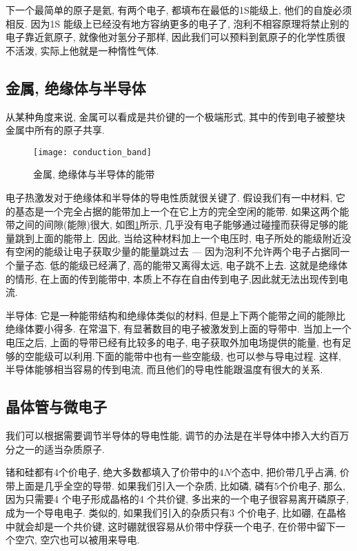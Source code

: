 \documentclass{article}
\begin{document}
下一个最简单的原子是氦, 有两个电子, 都填布在最低的1S能级上, 他们的自旋必须相反.
因为1S 能级上已经没有地方容纳更多的电子了, 泡利不相容原理将禁止别的电子靠近氦原子, 就像他对氢分子那样,
因此我们可以预料到氦原子的化学性质很不活泼, 实际上他就是一种惰性气体.

\subsection{金属, 绝缘体与半导体}
从某种角度来说, 金属可以看成是共价键的一个极端形式, 其中的传到电子被整块金属中所有的原子共享.

\begin{figure}[htbp]
		\centering
		\texttt{[image: conduction\_band]}
		\caption{金属, 绝缘体与半导体的能带}
		\label{fig.paoli.conduction}
\end{figure}
电子热激发对于绝缘体和半导体的导电性质就很关键了.
假设我们有一中材料, 它的基态是一个完全占据的能带加上一个在它上方的完全空闲的能带.
如果这两个能带之间的间隙(能隙)很大, 如图\ref{fig.paoli.conduction}所示, 几乎没有电子能够通过碰撞而获得足够的能量跳到上面的能带上.
因此, 当给这种材料加上一个电压时, 电子所处的能级附近没有空闲的能级让电子获取少量的能量跳过去 --- 因为泡利不允许两个电子占据同一个量子态.
低的能级已经满了, 高的能带又离得太远, 电子跳不上去. 这就是绝缘体的情形, 在上面的传到能带中, 本质上不存在自由传到电子,因此就无法出现传到电流.

半导体: 它是一种能带结构和绝缘体类似的材料, 但是上下两个能带之间的能隙比绝缘体要小得多. 在常温下, 有显著数目的电子被激发到上面的导带中.
当加上一个电压之后, 上面的导带已经有比较多的电子, 电子获取外加电场提供的能量, 也有足够的空能级可以利用.下面的能带中也有一些空能级, 也可以参与导电过程.
这样, 半导体能够相当容易的传到电流, 而且他们的导电性能跟温度有很大的关系.

\subsection{晶体管与微电子}
我们可以根据需要调节半导体的导电性能, 调节的办法是在半导体中掺入大约百万分之一的适当杂质原子.

锗和硅都有4个价电子, 绝大多数都填入了价带中的$4N$个态中, 把价带几乎占满, 价带上面是几乎全空的导带.
如果我们引入一个杂质, 比如磷, 磷有$5$个价电子, 那么, 因为只需要4 个电子形成晶格的4 个共价键, 多出来的一个电子很容易离开磷原子, 成为一个导电电子.
类似的, 如果我们引入的杂质只有3 个价电子, 比如硼, 在晶格中就会却是一个共价键, 这时硼就很容易从价带中俘获一个电子, 在价带中留下一个空穴, 空穴也可以被用来导电.
\end{document}
